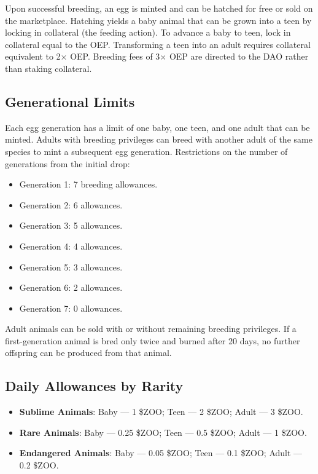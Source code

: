 Upon successful breeding, an egg is minted and can be hatched for free or sold on the marketplace. Hatching yields a baby animal that can be grown into a teen by locking in collateral (the feeding action). To advance a baby to teen, lock in collateral equal to the OEP. Transforming a teen into an adult requires collateral equivalent to 2$\times$ OEP. Breeding fees of 3$\times$ OEP are directed to the DAO rather than staking collateral.

\subsection{Generational Limits}

Each egg generation has a limit of one baby, one teen, and one adult that can be minted. Adults with breeding privileges can breed with another adult of the same species to mint a subsequent egg generation. Restrictions on the number of generations from the initial drop:
\begin{itemize}
  \item Generation 1: 7 breeding allowances.
  \item Generation 2: 6 allowances.
  \item Generation 3: 5 allowances.
  \item Generation 4: 4 allowances.
  \item Generation 5: 3 allowances.
  \item Generation 6: 2 allowances.
  \item Generation 7: 0 allowances.
\end{itemize}

Adult animals can be sold with or without remaining breeding privileges. If a first-generation animal is bred only twice and burned after 20 days, no further offspring can be produced from that animal.

\subsection{Daily Allowances by Rarity}

\begin{itemize}
  \item \textbf{Sublime Animals}: Baby --- 1 \$ZOO; Teen --- 2 \$ZOO; Adult --- 3 \$ZOO.
  \item \textbf{Rare Animals}: Baby --- 0.25 \$ZOO; Teen --- 0.5 \$ZOO; Adult --- 1 \$ZOO.
  \item \textbf{Endangered Animals}: Baby --- 0.05 \$ZOO; Teen --- 0.1 \$ZOO; Adult --- 0.2 \$ZOO.
\end{itemize}
